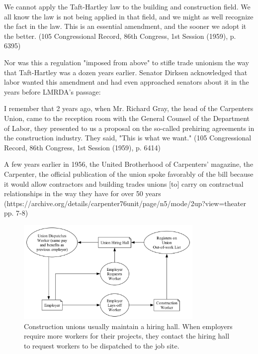 \documentclass[12pt]{article}
\renewenvironment{quote}
  {\list{}{\leftmargin=\parindent\rightmargin=0pt}%
   \item\relax}
  {\endlist}
\begin{document}
\begin{quote}
	We cannot apply the Taft-Hartley law to the building and construction field. We all know the law is not being applied in that field, and we might as well recognize the fact in the law. This is an essential amendment, and the sooner we adopt it the better. (105 Congressional Record, 86th Congress, 1st Session (1959), p. 6395) 
\end{quote}

Nor was this a regulation "imposed from above" to stifle trade unionism the way that Taft-Hartley was a dozen years earlier. Senator Dirksen acknowledged that labor wanted this amendment and had even approached senators about it in the years before LMRDA’s passage:

\begin{quote}
I remember that 2 years ago, when Mr. Richard Gray, the head of the Carpenters Union, came to the reception room with the General Counsel of the Department of Labor, they presented to us a proposal on the so-called prehiring agreements in the construction industry. They said, "This is what we want." (105 Congressional Record, 86th Congress, 1st Session (1959), p. 6414)
\end{quote}

A few years earlier in 1956, the United Brotherhood of Carpenters’ magazine, the Carpenter, the official publication of the union spoke favorably of the bill because it would allow contractors and building trades unions [to] carry on contractual relationships in the way they have for over 50 years (https://archive.org/details/carpenter76unit/page/n5/mode/2up?view=theater pp. 7-8)

\begin{figure}[ht]
  \centering
  \includegraphics[width=0.8\textwidth]{images/hiring_hall}
  \captionsetup{justification=centering, singlelinecheck=false, margin=2cm} 
  \caption{Construction unions usually maintain a hiring hall. When employers require more workers for their projects, they contact the hiring hall to request workers to be dispatched to the job site.}
  \label{fig:hiring_hall}
\end{figure}
\end{document}
